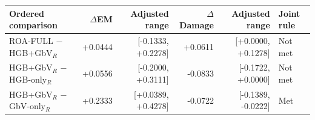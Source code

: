 \begin{tabular}{lrrrrl}
\toprule
Ordered comparison & $\Delta$EM & Adjusted range & $\Delta$Damage & Adjusted range & Joint rule \\
\midrule
ROA-FULL $-$ HGB+GbV$_R$ & +0.0444 & [-0.1333, +0.2278] & +0.0611 & [+0.0000, +0.1278] & Not met \\
HGB+GbV$_R$ $-$ HGB-only$_R$ & +0.0556 & [-0.2000, +0.3111] & -0.0833 & [-0.1722, +0.0000] & Not met \\
HGB+GbV$_R$ $-$ GbV-only$_R$ & +0.2333 & [+0.0389, +0.4278] & -0.0722 & [-0.1389, -0.0222] & Met \\
\bottomrule
\end{tabular}
